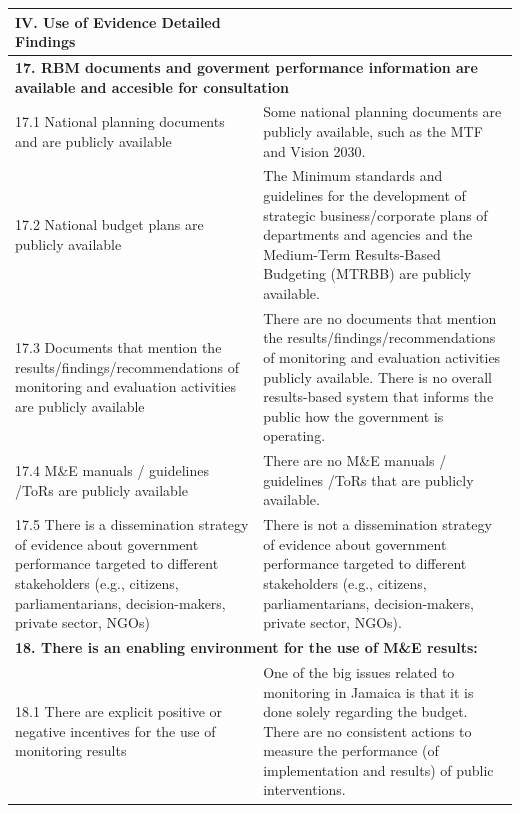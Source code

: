 \documentclass[
  10pt,
]{book}
\begin{document}
\begin{table}
\centering
\begin{tabular}[t]{l|l}
\hline
IV. Use of Evidence Detailed Findings &  \\
\hline
\multicolumn{2}{l}{\textbf{17. RBM documents and goverment performance information are available and accesible for consultation}}\\
\hline
\hspace{1em}17.1 National planning documents and are publicly available & Some national planning documents are publicly available, such as the MTF and Vision 2030.\\
\hline
\hspace{1em}17.2 National budget plans are publicly available & The Minimum standards and guidelines for the development of strategic business/corporate plans of departments and agencies and the Medium-Term Results-Based Budgeting (MTRBB) are publicly available.\\
\hline
\hspace{1em}17.3 Documents that mention the results/findings/recommendations of monitoring and evaluation activities are publicly available & There are no documents that mention the results/findings/recommendations of monitoring and evaluation activities publicly available. There is no overall results-based system that informs the public how the government is operating.\\
\hline
\hspace{1em}17.4 M\&E manuals / guidelines /ToRs are publicly available & There are no M\&E manuals / guidelines /ToRs that are publicly available.\\
\hline
\hspace{1em}17.5 There is a dissemination strategy of evidence about government performance targeted to different stakeholders (e.g., citizens, parliamentarians, decision-makers, private sector, NGOs) & There is not a dissemination strategy of evidence about government performance targeted to different stakeholders (e.g., citizens, parliamentarians, decision-makers, private sector, NGOs).\\
\hline
\multicolumn{2}{l}{\textbf{18. There is an enabling environment for the use of M\&E results:}}\\
\hline
\hspace{1em}18.1 There are explicit positive or negative incentives for the use of monitoring results & One of the big issues related to monitoring in Jamaica is that it is done solely regarding the budget. There are no consistent actions to measure the performance (of implementation and results) of public interventions.\\

\end{tabular}
\end{table}
\end{document}
